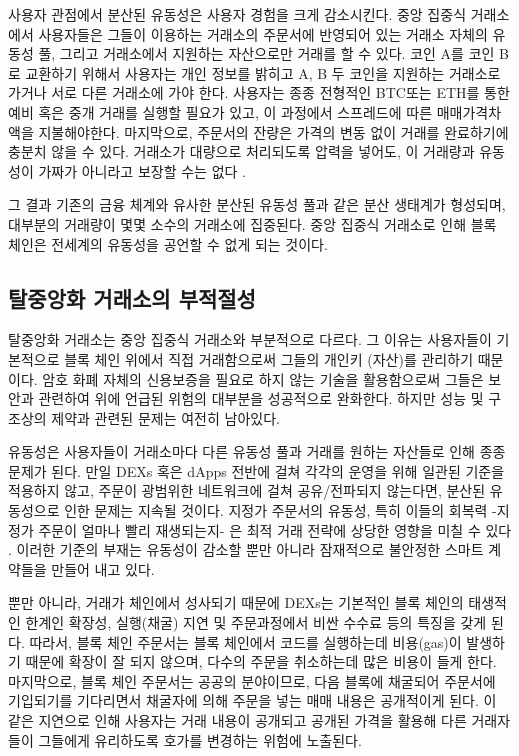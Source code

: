 \documentclass{article}
\begin{document}
\begin{multicols}{2}
사용자 관점에서 분산된 유동성은 사용자 경험을 크게 감소시킨다. 중앙 집중식 거래소에서 사용자들은 그들이 이용하는 거래소의 주문서에 반영되어 있는 거래소 자체의 유동성 풀, 그리고 거래소에서 지원하는 자산으로만 거래를 할 수 있다. 코인 A를 코인 B로 교환하기 위해서 사용자는 개인 정보를 밝히고 A, B 두 코인을 지원하는 거래소로 가거나 서로 다른 거래소에 가야 한다. 사용자는 종종 전형적인 BTC또는 ETH를 통한 예비 혹은 중개 거래를 실행할 필요가 있고, 이 과정에서 스프레드에 따른 매매가격차액을 지불해야한다. 마지막으로, 주문서의 잔량은 가격의 변동 없이 거래를 완료하기에 충분치 않을 수 있다. 거래소가 대량으로 처리되도록 압력을 넣어도, 이 거래량과 유동성이 가짜가 아니라고 보장할 수는  없다 \cite{fakevolume}.

그 결과 기존의 금융 체계와 유사한 분산된 유동성 풀과 같은 분산 생태계가 형성되며, 대부분의 거래량이 몇몇 소수의 거래소에 집중된다. 중앙 집중식 거래소로 인해 블록 체인은 전세계의 유동성을 공언할 수 없게 되는 것이다.

\subsection{탈중앙화 거래소의 부적절성}
탈중앙화 거래소는 중앙 집중식 거래소와 부분적으로 다르다. 그 이유는 사용자들이 기본적으로 블록 체인 위에서 직접 거래함으로써 그들의 개인키 (자산)를 관리하기 때문이다. 암호 화폐 자체의 신용보증을 필요로 하지 않는 기술을 활용함으로써 그들은 보안과 관련하여 위에 언급된 위험의 대부분을 성공적으로 완화한다. 하지만 성능 및 구조상의 제약과 관련된 문제는 여전히 남아있다. 

유동성은 사용자들이 거래소마다 다른 유동성 풀과 거래를 원하는 자산들로 인해 종종 문제가 된다. 만일 DEXs 혹은 dApps 전반에 걸쳐 각각의 운영을 위해 일관된 기준을 적용하지 않고, 주문이 광범위한 네트워크에 걸쳐 공유/전파되지 않는다면, 분산된 유동성으로 인한 문제는 지속될 것이다. 지정가 주문서의 유동성, 특히 이들의 회복력 -지정가 주문이 얼마나 빨리 재생되는지- 은 최적 거래 전략에 상당한 영향을 미칠 수 있다 \cite{limitorderliquidity}. 이러한 기준의 부재는 유동성이 감소할 뿐만 아니라 잠재적으로 불안정한 스마트 계약들을 만들어 내고 있다.

뿐만 아니라, 거래가 체인에서 성사되기 때문에 DEXs는 기본적인 블록 체인의 태생적인 한계인 확장성, 실행(채굴) 지연 및 주문과정에서 비싼 수수료 등의 특징을 갖게 된다. 따라서, 블록 체인 주문서는 블록 체인에서 코드를 실행하는데 비용(gas)이 발생하기 때문에 확장이 잘 되지 않으며, 다수의 주문을 취소하는데 많은 비용이 들게 한다. 마지막으로, 블록 체인 주문서는 공공의 분야이므로, 다음 블록에 채굴되어 주문서에 기입되기를 기다리면서 채굴자에 의해 주문을 넣는 매매 내용은 공개적이게 된다. 이 같은 지연으로 인해 사용자는 거래 내용이 공개되고 공개된 가격을 활용해 다른 거래자들이 그들에게 유리하도록 호가를 변경하는 위험에 노출된다.


\end{multicols}
\end{document}
